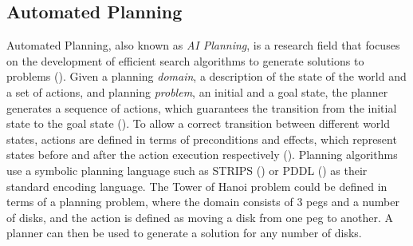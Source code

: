 \subsection{Automated Planning}
Automated Planning, also known as \textit{AI Planning}, is a research field that focuses on the development of efficient search algorithms to generate solutions to problems (\cite{ghallab2004automated}).
Given a planning \textit{domain}, \ie a description of the state of the world and a set of actions, and planning \textit{problem}, \ie an initial and a goal state, the planner generates a sequence of actions, which guarantees the transition from the initial state to the goal state ().
To allow a correct transition between different world states, actions are defined in terms of preconditions and effects, which represent states before and after the action execution respectively ().
Planning algorithms use a symbolic planning language such as STRIPS (\cite{fikes1971strips}) or PDDL (\cite{ghallab2004automated}) as their standard encoding language.
The Tower of Hanoi problem could be defined in terms of a planning problem, where the domain consists of 3 pegs and a number of disks, and the action is defined as moving a disk from one peg to another.
A planner can then be used to generate a solution for any number of disks.


